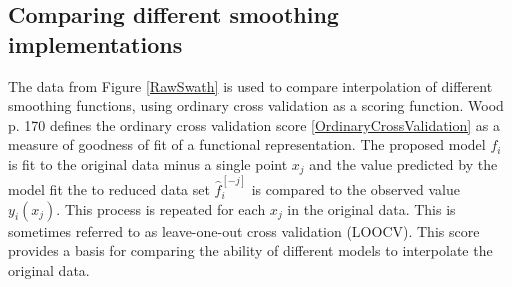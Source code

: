 \documentclass[phdcss]{SDSUThesis}
\begin{document}







\clearpage

\subsection{Comparing different smoothing implementations}

The data from Figure \ref{RawSwath} is used to compare interpolation of different smoothing functions, using ordinary cross validation as a scoring function. Wood \cite{wood-2017} p. 170 defines the ordinary cross validation score \ref{OrdinaryCrossValidation}
as a measure of goodness of fit of a functional representation. The proposed model $f_i$ is fit to the original data minus a single point $x_j$ and the value predicted by the model fit the to reduced data set $\widehat{f}_i^{[-j]}$ is compared to the observed value $y_i(x_j)$. This process is repeated for each $x_j$ in the original data. This is sometimes referred to as leave-one-out cross validation (LOOCV). This score provides a basis for comparing the ability of different models to interpolate the original data.
\end{document}
